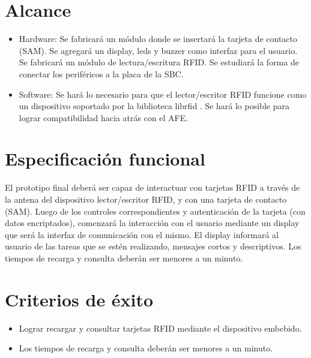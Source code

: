 \section{Alcance}

\begin{itemize}

\item Hardware: Se fabricar\'a un m\'odulo donde se insertar\'a la tarjeta de contacto (SAM).
Se agregar\'a un display, leds y buzzer como interfaz para el usuario. Se fabricar\'a un m\'odulo de lectura/escritura RFID. Se estudiar\'a la forma de conectar los perif\'ericos a la placa de la SBC.

\item Software: Se har\'a lo necesario para que el lector/escritor RFID funcione como un dispositivo soportado por la biblioteca librfid \cite{librfid}. Se hará lo posible para lograr compatibilidad hacia atrás con el AFE.
    
\end{itemize}

\section{Especificaci\'on funcional}

El prototipo final deber\'a ser capaz de interactuar con tarjetas RFID a trav\'es de la antena del dispositivo lector/escritor RFID, y con una tarjeta de contacto (SAM). Luego de los controles correspondientes y autenticaci\'on de la tarjeta (con datos encriptados), comenzar\'a la interacci\'on con el usuario mediante un display que ser\'a la interfaz de comunicaci\'on con el mismo. El display informar\'a al usuario de las tareas que se est\'en realizando, mensajes cortos y descriptivos. Los tiempos de recarga y consulta deber\'an ser menores a un minuto.

\section{Criterios de \'exito}

\begin{itemize}

\item Lograr recargar y consultar tarjetas RFID mediante el dispositivo embebido.

\item Los tiempos de recarga y consulta deber\'an ser menores a un minuto.

\end{itemize}